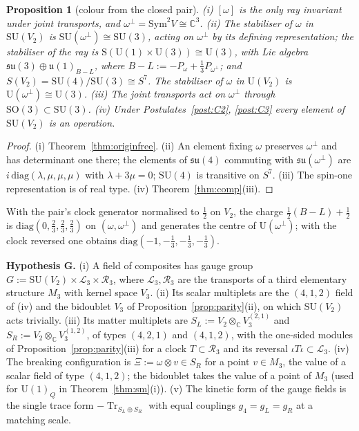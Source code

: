 \documentclass[aps,pra,onecolumn,superscriptaddress,nofootinbib,10pt]{revtex4-2}
\newtheorem{proposition}[theorem]{Proposition}
\theoremstyle{definition}
\theoremstyle{remark}
\newcommand{\C}{\mathbb{C}}
\newcommand{\su}{\mathfrak{su}}
\newcommand{\cL}{\mathcal{L}}
\newcommand{\cR}{\mathcal{R}}
\newcommand{\tr}{\operatorname{Tr}}
\newcommand{\SU}{\mathrm{SU}}
\newcommand{\SO}{\mathrm{SO}}
\newcommand{\U}{\mathrm{U}}
\begin{document}
\begin{proposition}[colour from the closed pair]\label{prop:pairsu3}
(i) $[\omega]$ is the only ray invariant under joint transports, and $\omega^\perp=\mathrm{Sym}^2V\cong\C^3$.
(ii) The stabiliser of $\omega$ in $\SU(V_2)$ is $\SU(\omega^\perp)\cong\SU(3)$, acting on $\omega^\perp$ by
its defining representation; the stabiliser of the ray is $\mathrm S(\U(1)\times\U(3))\cong\U(3)$, with
Lie algebra $\su(3)\oplus\mathfrak u(1)_{B-L}$, where $B-L:=-P_\omega+\tfrac13P_{\omega^\perp}$; and
$S(V_2)=\SU(4)/\SU(3)\cong S^7$.  The stabiliser of $\omega$ in $\U(V_2)$ is $\U(\omega^\perp)\cong\U(3)$.
(iii) The joint transports act on $\omega^\perp$ through $\SO(3)\subset\SU(3)$.
(iv) Under Postulates~\ref{post:C2}, \ref{post:C3} every element of $\SU(V_2)$ is an operation.
\end{proposition}
\begin{proof}
(i) Theorem~\ref{thm:originfree}.  (ii) An element fixing $\omega$ preserves $\omega^\perp$ and has
determinant one there; the elements of $\su(4)$ commuting with $\su(\omega^\perp)$ are
$i\,\mathrm{diag}(\lambda,\mu,\mu,\mu)$ with $\lambda+3\mu=0$; $\SU(4)$ is transitive on $S^7$.  (iii) The
spin-one representation is of real type.  (iv) Theorem~\ref{thm:comp}(iii).
\end{proof}
With the pair's clock generator normalised to $\tfrac12$ on $V_2$, the charge $\tfrac12(B-L)+\tfrac12$ is
$\mathrm{diag}(0,\tfrac23,\tfrac23,\tfrac23)$ on $(\omega,\omega^\perp)$ and generates the centre of
$\U(\omega^\perp)$; with the clock reversed one obtains $\mathrm{diag}(-1,-\tfrac13,-\tfrac13,-\tfrac13)$.

\smallskip\noindent\textbf{Hypothesis G.}\label{hyp:G}  (i) A field of composites has gauge group
$G:=\SU(V_2)\times\cL_3\times\cR_3$, where $\cL_3,\cR_3$ are the transports of a third elementary
structure $M_3$ with kernel space $V_3$.  (ii) Its scalar multiplets are the $(4,1,2)$ field of (iv) and the bidoublet $V_3$ of
Proposition~\ref{prop:parity}(ii), on which $\SU(V_2)$ acts trivially.  (iii) Its matter multiplets are
$S_L:=V_2\otimes_\C V_3^{(2,1)}$ and $S_R:=V_2\otimes_\C V_3^{(1,2)}$, of types $(4,2,1)$ and $(4,1,2)$,
with the one-sided modules of Proposition~\ref{prop:parity}(iii) for a clock $T\subset\cR_3$ and its
reversal $\iota T\iota\subset\cL_3$.  (iv) The breaking configuration is $\Xi:=\omega\otimes v\in S_R$ for a
point $v\in M_3$, the value of a scalar field of type $(4,1,2)$; the bidoublet takes the value of a
point of $M_3$ (used for $\U(1)_Q$ in Theorem~\ref{thm:sm}(i)).  (v) The kinetic form of the gauge
fields is the single trace form $-\tr_{S_L\oplus S_R}$ with equal couplings $g_4=g_L=g_R$ at a matching
scale.
\end{document}
